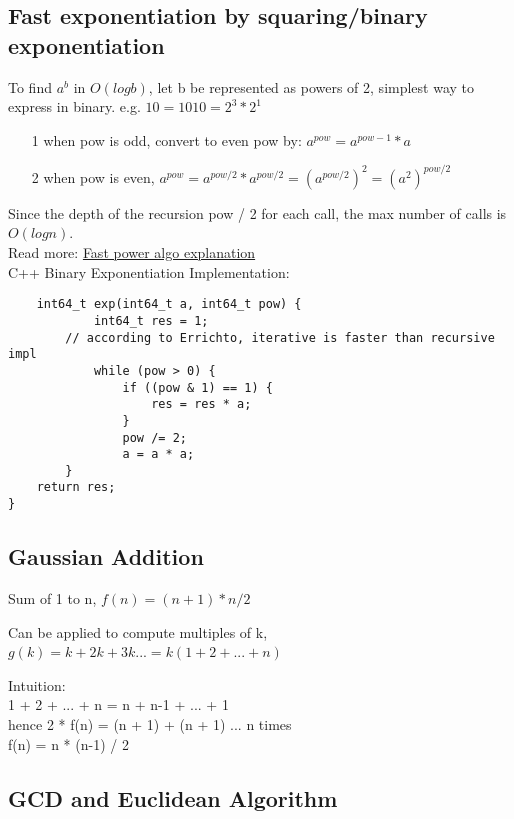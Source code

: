 \documentclass[12pt]{article}
\begin{document}
\subsection{Fast exponentiation by squaring/binary exponentiation}

To find \(a^b\) in \(O(logb)\),  let b be represented as powers of 2, simplest way to express in binary. 
e.g. \(10 = 1010 = 2^3 * 2^1\)

\begin{itemize}
	\item[1] when pow is odd, convert to even pow by: \(a^{pow} = a^{pow - 1} * a\)
	\item[2] when pow is even, \(a^{pow} = a^{pow / 2} * a^{pow / 2} = (a^{pow / 2})^2 = (a^2)^{pow / 2}\)
\end{itemize} 

Since the depth of the recursion pow / 2 for each call, the max number of calls is \(O(log n)\). \\ [\baselineskip]

\noindent Read more: \href{https://www.rookieslab.com/posts/fast-power-algorithm-exponentiation-by-squaring-cpp-python-implementation}{Fast power algo explanation} \\ [\baselineskip]

\noindent C++ Binary Exponentiation Implementation:
\begin{verbatim}
	int64_t exp(int64_t a, int64_t pow) {
    		int64_t res = 1; 
		// according to Errichto, iterative is faster than recursive impl
    		while (pow > 0) {
        		if ((pow & 1) == 1) {
            		res = res * a; 
        		} 
        		pow /= 2; 
        		a = a * a; 
    	}
    return res; 
} 
\end{verbatim} 

\subsection{Gaussian Addition} 
Sum of 1 to n, \( f(n) = (n + 1) * n / 2 \)

\noindent Can be applied to compute multiples of k, \( g(k) = k + 2k + 3k ... = k(1 + 2 + ... + n) \)\

Intuition: \\ 

1 + 2 + ... + n = n + n-1 + ... + 1 \\
hence 2 * f(n) = (n + 1) + (n + 1) ... n times \\ 
f(n) = n * (n-1) / 2 

\subsection{GCD and Euclidean Algorithm} 
\end{document}
